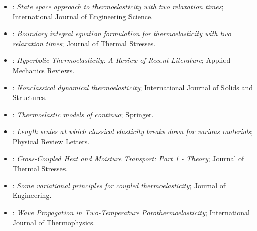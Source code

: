 \begin{itemize}
\item \citet{Sherief1993a}: \emph{State space approach to thermoelasticity with two relaxation times}; International Journal of Engineering Science.
\item \citet{Anwar1994}: \emph{Boundary integral equation formulation for thermoelasticity with two relaxation times}; Journal of Thermal Stresses.
\item \citet{Chandrasekharaiah1998}: \emph{Hyperbolic Thermoelasticity: A Review of Recent Literature}; Applied Mechanics Reviews.
\item \citet{HetnarskiIgnaczak2000}: \emph{Nonclassical dynamical thermoelasticity}; International Journal of Solids and Structures.
\item \citet{Iesan2004}: \emph{Thermoelastic models of continua}; Springer.
\item \citet{Maranganti2007}: \emph{Length scales at which classical elasticity breaks down for various materials}; Physical Review Letters.
\item \citet{Szekeres2012}: \emph{Cross-Coupled Heat and Moisture Transport: Part 1 - Theory}; Journal of Thermal Stresses.
\item \citet{Marotti2013}: \emph{Some variational principles for coupled thermoelasticity}; Journal of Engineering.
\item \citet{Singh2020}: \emph{Wave Propagation in Two-Temperature Porothermoelasticity}; International Journal of Thermophysics.
\end{itemize}
